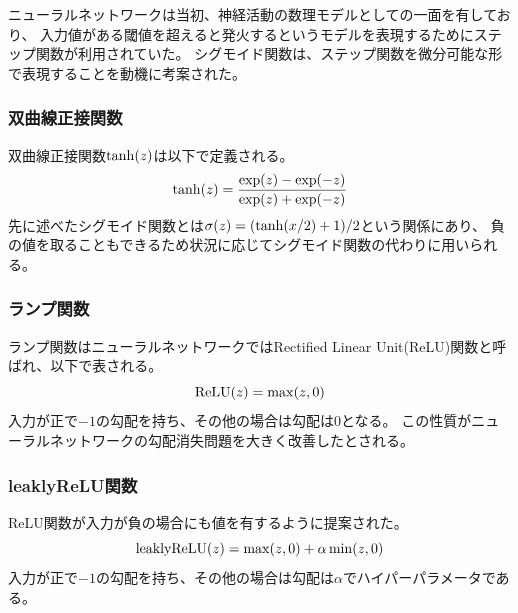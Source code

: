 ニューラルネットワークは当初、神経活動の数理モデルとしての一面を有しており、
入力値がある閾値を超えると発火するというモデルを表現するためにステップ関数が利用されていた。
シグモイド関数は、ステップ関数を微分可能な形で表現することを動機に考案された。

\subsubsection{\mc 双曲線正接関数}
双曲線正接関数\({\rm tanh}(z)\)は以下で定義される。
\begin{equation}
    {\rm tanh}(z) = \frac{\exp(z) - \exp(-z)}{\exp(z)+\exp(-z)}
\end{equation}
先に述べたシグモイド関数とは\(\sigma(z)=({\rm tanh}(x/2) + 1)/2\)という関係にあり、
負の値を取ることもできるため状況に応じてシグモイド関数の代わりに用いられる。

\subsubsection{\mc ランプ関数}
ランプ関数はニューラルネットワークではRectified Linear Unit(ReLU)関数と呼ばれ、以下で表される。
\begin{equation}
    {\rm ReLU}(z) = \max(z,0)
\end{equation}
入力が正で\(-1\)の勾配を持ち、その他の場合は勾配は\(0\)となる。
この性質がニューラルネットワークの勾配消失問題を大きく改善したとされる。

\subsubsection{\rm leaklyReLU\mc 関数}
ReLU関数が入力が負の場合にも値を有するように提案された。
\begin{equation}
    {\rm leaklyReLU}(z) = \max(z,0) + \alpha \min(z,0)
\end{equation}
入力が正で\(-1\)の勾配を持ち、その他の場合は勾配は\(\alpha\)でハイパーパラメータである。

